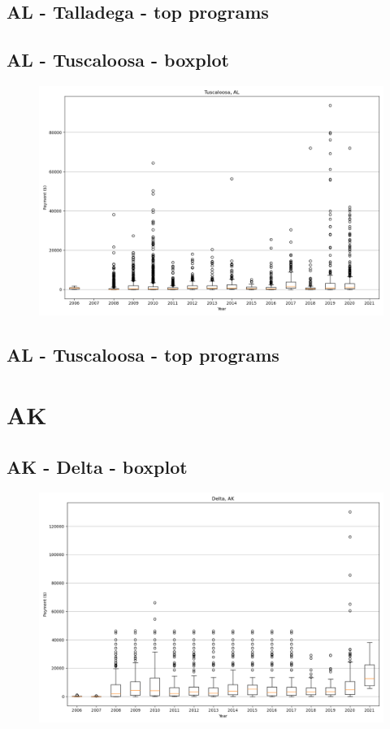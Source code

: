\subsection*{AL - Talladega - top programs}

\newpage
\subsection*{AL - Tuscaloosa - boxplot}
\begin{figure}[h]
\centering
\includegraphics[width=7in]{../output/boxplots/counties/Tuscaloosa-AL_boxplot.png}
\end{figure}


\subsection*{AL - Tuscaloosa - top programs}

\newpage
\section*{AK}
\subsection*{AK - Delta - boxplot}
\begin{figure}[h]
\centering
\includegraphics[width=7in]{../output/boxplots/counties/Delta-AK_boxplot.png}
\end{figure}


